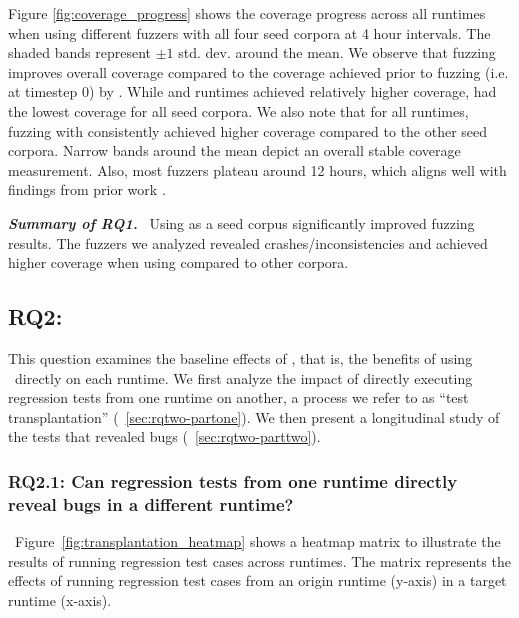 \documentclass[lettersize,journal]{IEEEtran}
\begin{document}



Figure \ref{fig:coverage_progress} shows the coverage progress across all runtimes when using different fuzzers with all four seed corpora at 4 hour intervals. The shaded bands represent $\pm 1$ std. dev. around the mean. We observe that fuzzing improves overall coverage compared to the coverage achieved prior to fuzzing (i.e. at timestep 0) by \CoverageImprovementOverall{}. While \wasmedge{} and \wamr{} runtimes achieved relatively higher coverage, \wasmtime{} had the lowest coverage for all seed corpora. We also note that for all runtimes, fuzzing with \rtbench{} consistently achieved higher coverage compared to the other seed corpora. Narrow bands around the mean depict an overall stable coverage measurement. Also, most fuzzers plateau around 12 hours, which aligns well with findings from prior work \cite{gao2023beyond}. 

\begin{tcolorbox}[rqbox]
\emph{\textbf{Summary of RQ1.}}~
Using \tname{} as a seed corpus significantly improved fuzzing results. The fuzzers we analyzed revealed \FuzzingBugsCount{} crashes/inconsistencies and achieved higher coverage when using \rtbench{} compared to other corpora.
\end{tcolorbox}

\subsection{\textbf{RQ2: \rqtwo{}}}
\label{sec:rqtwo}



This question examines the baseline effects of \tname, that is, the benefits of using \tname\ directly on each runtime. We first analyze the impact of directly executing regression tests from one runtime on another, a process we refer to as ``test transplantation'' (\textsection~\ref{sec:rqtwo-partone}). We then present a longitudinal study of the tests that revealed bugs (\textsection~\ref{sec:rqtwo-parttwo}).

\subsubsection{\label{sec:rqtwo-partone}RQ2.1: Can regression tests from one runtime directly reveal bugs in a different runtime?}~Figure~\ref{fig:transplantation_heatmap} 
shows a heatmap matrix to illustrate the results of running regression test cases across runtimes. The matrix represents the effects of running regression test cases from an origin runtime (y-axis) in a target runtime (x-axis). 
\end{document}
